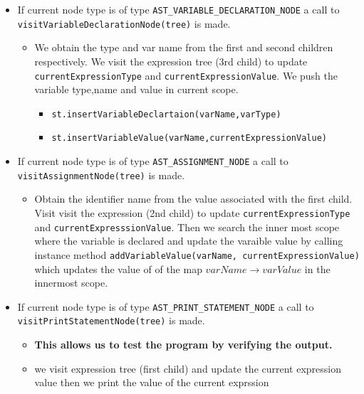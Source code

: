 \begin{itemize}
	\item If current node type is of type \verb!AST_VARIABLE_DECLARATION_NODE! a call to \verb!visitVariableDeclarationNode(tree)! is made.
	      \begin{itemize}
	      	\item We obtain the type and var name from the first  and second children respectively. We visit the expression tree (3rd child) to update \verb!currentExpressionType!  and \verb!currentExpressionValue!. We push the variable type,name and value in current scope.
	      	      \begin{itemize}
	      	      	\item \verb!st.insertVariableDeclartaion(varName,varType)!
	      	      	\item \verb!st.insertVariableValue(varName,currentExpressionValue)!
	      	      \end{itemize}
	      \end{itemize}
	\item If current node type is of type \verb!AST_ASSIGNMENT_NODE! a call to \verb!visitAssignmentNode(tree)! is made.
	      \begin{itemize}
	      	\item Obtain the identifier name from the value associated with the first child. Visit visit the expression (2nd child) to update \verb!currentExpressionType! and \verb!currentExpresssionValue!. Then we search the inner most scope where the variable is declared and update the varaible value by calling instance method
	      	      \verb!addVariableValue(varName, currentExpressionValue)! which updates the value of of the map $varName \rightarrow varValue$ in the innermost scope.
	      \end{itemize}
	\item If current node type is of type \verb!AST_PRINT_STATEMENT_NODE! a call to \verb!visitPrintStatementNode(tree)! is made. 
	      \begin{itemize}
	      	\item \textbf{This allows us to test the program by verifying the output.}
	      	\item we visit expression tree (first child) and update the current expression value then we print the value of the current exprssion
	      	      	      	      	      	              

\end{itemize}
\end{itemize}

